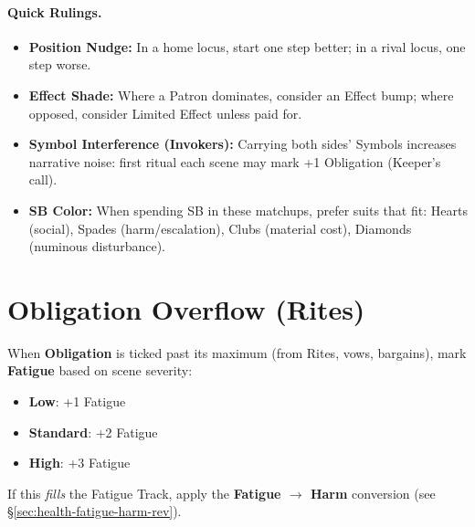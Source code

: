 \paragraph{Quick Rulings.}
\begin{itemize}
  \item \textbf{Position Nudge:} In a home locus, start one step better; in a rival locus, one step worse.
  \item \textbf{Effect Shade:} Where a Patron dominates, consider an Effect bump; where opposed, consider Limited Effect unless paid for.
  \item \textbf{Symbol Interference (Invokers):} Carrying both sides’ Symbols increases narrative noise: first ritual each scene may mark +1 Obligation (Keeper’s call).
  \item \textbf{SB Color:} When spending SB in these matchups, prefer suits that fit: Hearts (social), Spades (harm/escalation), Clubs (material cost), Diamonds (numinous disturbance).
\end{itemize}

\section{Obligation Overflow (Rites)}
\label{sec:obligation-overflow}

When \textbf{Obligation} is ticked past its maximum (from Rites, vows, bargains), mark \textbf{Fatigue} based on scene severity:
\begin{itemize}
  \item \textbf{Low}: +1 Fatigue
  \item \textbf{Standard}: +2 Fatigue
  \item \textbf{High}: +3 Fatigue
\end{itemize}
If this \emph{fills} the Fatigue Track, apply the \textbf{Fatigue $\rightarrow$ Harm} conversion (see \S\ref{sec:health-fatigue-harm-rev}).
